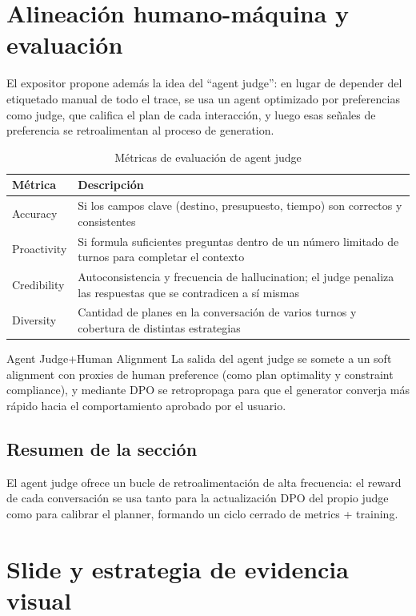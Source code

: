 \documentclass[a4paper]{article}
\begin{document}
\section{Alineación humano-máquina y evaluación}

El expositor propone además la idea del ``agent judge'': en lugar de depender del etiquetado manual de todo el trace, se usa un agent optimizado por preferencias como judge, que califica el plan de cada interacción, y luego esas señales de preferencia se retroalimentan al proceso de generation.
\begin{table}[H]
\centering
\begin{tabular}{lp{6cm}}
\toprule
Métrica & Descripción \\
\midrule
Accuracy & Si los campos clave (destino, presupuesto, tiempo) son correctos y consistentes \\
Proactivity & Si formula suficientes preguntas dentro de un número limitado de turnos para completar el contexto \\
Credibility & Autoconsistencia y frecuencia de hallucination; el judge penaliza las respuestas que se contradicen a sí mismas \\
Diversity & Cantidad de planes en la conversación de varios turnos y cobertura de distintas estrategias \\
\bottomrule
\end{tabular}
\caption{Métricas de evaluación de agent judge}
\end{table}

\begin{knowledgebox}{Agent Judge+Human Alignment}
La salida del agent judge se somete a un soft alignment con proxies de human preference (como plan optimality y constraint compliance), y mediante DPO se retropropaga para que el generator converja más rápido hacia el comportamiento aprobado por el usuario.
\end{knowledgebox}

\subsection{Resumen de la sección}

El agent judge ofrece un bucle de retroalimentación de alta frecuencia: el reward de cada conversación se usa tanto para la actualización DPO del propio judge como para calibrar el planner, formando un ciclo cerrado de metrics + training.

\section{Slide y estrategia de evidencia visual}
\end{document}
